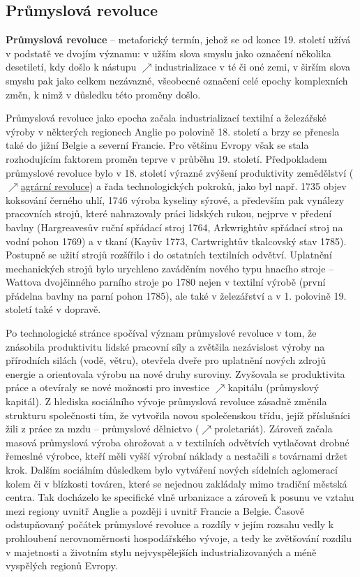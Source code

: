 \documentclass{article}
\begin{document}
  \subsection*{Průmyslová revoluce~\cite{Hroch:}}
  \label{sec:prumyslovaRevoluce}

  {\bf Průmyslová revoluce} -- metaforický termín, jehož se od konce 19. století užívá v podstatě ve dvojím významu: v užším slova smyslu jako označení několika desetiletí, kdy došlo k nástupu $\nearrow$industrializace v té či oné zemi, v širším slova smyslu pak jako celkem nezávazné, všeobecné označení celé epochy komplexních změn, k nimž v důsledku této proměny došlo.

  Průmyslová revoluce jako epocha začala industrializací textilní a železářské výroby v některých regionech Anglie po polovině 18. století a brzy se přenesla také do jižní Belgie a severní Francie. Pro většinu Evropy však se stala rozhodujícím faktorem proměn teprve v průběhu 19. století. Předpokladem průmyslové revoluce bylo v 18. století výrazné zvýšení produktivity zemědělství ($\nearrow$\hyperref[sec:agrarniRevoluce]{agrární revoluce}) a řada technologických pokroků, jako byl např. 1735 objev koksování černého uhlí, 1746 výroba kyseliny sýrové, a především pak vynálezy pracovních strojů, které nahrazovaly práci lidských rukou, nejprve v předení bavlny (Hargreavesův ruční spřádací stroj  1764, Arkwrightův spřádací stroj na vodní pohon 1769) a v tkaní (Kayův  1773, Cartwrightův tkalcovský stav 1785). Postupně se užití strojů rozšířilo i do ostatních textilních odvětví. Uplatnění mechanických strojů bylo urychleno zaváděním nového typu hnacího stroje -- Wattova dvojčinného parního stroje po 1780 nejen v textilní výrobě (první přádelna bavlny na parní pohon 1785), ale také v železářství a v 1. polovině 19. století také v dopravě.

  Po technologické stránce spočíval význam průmyslové revoluce v tom, že znásobila produktivitu lidské pracovní síly a zvětšila nezávislost výroby na přírodních silách (vodě, větru), otevřela dveře pro uplatnění nových zdrojů energie a orientovala výrobu na nové druhy suroviny. Zvyšovala se produktivita práce a otevíraly se nové možnosti pro investice $\nearrow$kapitálu (průmyslový kapitál). Z hlediska sociálního vývoje průmyslová revoluce zásadně změnila strukturu společnosti tím, že vytvořila novou společenskou třídu, jejíž příslušníci žili z práce za mzdu -- průmyslové dělnictvo ($\nearrow$proletariát). Zároveň začala masová průmyslová výroba ohrožovat a v textilních odvětvích vytlačovat drobné řemeslné výrobce, kteří měli vyšší výrobní náklady a nestačili s továrnami držet krok. Dalším sociálním důsledkem bylo vytváření nových sídelních aglomerací kolem či v blízkosti továren, které se nejednou zakládaly mimo tradiční městská centra. Tak docházelo ke specifické vlně urbanizace a zároveň k posunu ve vztahu mezi regiony uvnitř Anglie a později i uvnitř Francie a Belgie. Časově odstupňovaný počátek průmyslové revoluce a rozdíly v jejím rozsahu vedly k prohloubení nerovnoměrnosti hospodářského vývoje, a tedy ke zvětšování rozdílu v majetnosti a životním stylu nejvyspělejších industrializovaných a méně vyspělých regionů Evropy.
\end{document}
